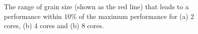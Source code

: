 \vspace{\baselineskip}	
\begin{figure}[H]
	\centering
	\caption{The range of grain size (shown as the red line) that leads to a performance within $10\%$ of the maximum performance for (a) 2 cores, (b) 4 cores and (b) 8 cores.}	
	\label{fig12}
\end{figure}


